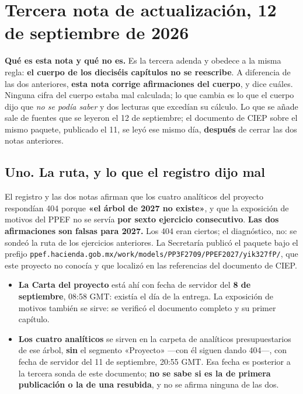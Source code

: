 \chapter*{Tercera nota de actualización, 12 de septiembre de 2026}


\textbf{Qué es esta nota y qué no es.} Es la tercera adenda y obedece a la misma regla:
\textbf{el cuerpo de los dieciséis capítulos no se reescribe}. A diferencia de las dos
anteriores, \textbf{esta nota corrige afirmaciones del cuerpo}, y dice cuáles. Ninguna cifra
del cuerpo estaba mal calculada; lo que cambia es lo que el cuerpo dijo que \emph{no se podía
saber} y dos lecturas que excedían su cálculo. Lo que se añade sale de fuentes que se
leyeron el 12 de septiembre; el documento de CIEP sobre el mismo paquete, publicado el 11, se
leyó ese mismo día, \textbf{después} de cerrar las dos notas anteriores.

\section*{Uno. La ruta, y lo que el registro dijo mal}

El registro y las dos notas afirman que los cuatro analíticos del proyecto respondían 404
porque \textbf{«el árbol de 2027 no existe»}, y que la exposición de motivos del PPEF no se
servía \textbf{por sexto ejercicio consecutivo}. \textbf{Las dos afirmaciones son falsas
para 2027.} Los 404 eran ciertos; el diagnóstico, no: se sondeó la ruta de los ejercicios
anteriores. La Secretaría publicó el paquete bajo el prefijo
\texttt{ppef.hacienda.gob.mx/work/models/PP3F2709/PPEF2027/yik327fP/}, que este proyecto no
conocía y que localizó en las referencias del documento de CIEP.

\begin{itemize}
\item \textbf{La Carta del proyecto} está ahí con fecha de servidor del \textbf{8 de
septiembre}, 08:58 GMT: existía el día de la entrega. La exposición de motivos también se
sirve: se verificó el documento completo y su primer capítulo.
\item \textbf{Los cuatro analíticos} se sirven en la carpeta de analíticos presupuestarios de
ese árbol, \textbf{sin} el segmento «Proyecto» ---con él siguen dando 404---, con fecha de
servidor del 11 de septiembre, 20:55 GMT. Esa fecha es posterior a la tercera sonda de este
documento; \textbf{no se sabe si es la de primera publicación o la de una resubida}, y no se
afirma ninguna de las dos.
\end{itemize}

